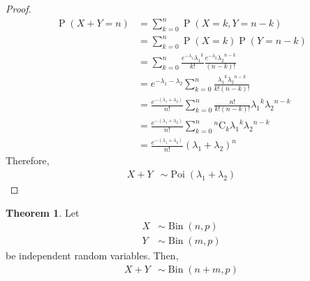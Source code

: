 \documentclass[titlepage, fleqn, a4paper, 12pt, twoside]{article}
\theoremstyle{definition}
\theoremstyle{theorem}
\newtheorem{theorem}{Theorem}
\DeclareMathOperator{\prob}{\mathrm{P}}
\DeclareMathOperator{\bin}{\mathrm{Bin}}
\DeclareMathOperator{\poi}{\mathrm{Poi}}
\newcommand*{\comb}[2]{{}^{#1}\mathrm{C}_{#2}}%
\begin{document}
\begin{proof}
	\begin{align*}
		\prob(X + Y = n) & = \sum\limits_{k = 0}^{n} \prob(X = k , Y = n - k)                                                                         \\
                                 & = \sum\limits_{k = 0}^{n} \prob(X = k) \prob(Y = n - k)                                                                    \\
                                 & = \sum\limits_{k = 0}^{n} \frac{e^{-\lambda_1} {\lambda_1}^k}{k!} \frac{e^{-\lambda_2} {\lambda_2}^{n - k}}{(n - k)!}      \\
                                 & = e^{-\lambda_1 - \lambda_2} \sum\limits_{k = 0}^{n} \frac{{\lambda_1}^k {\lambda_2}^{n - k}}{k! (n - k)!}                 \\
                                 & = \frac{e^{-(\lambda_1 + \lambda_2)}}{n!} \sum\limits_{k = 0}^{n} \frac{n!}{k! (n - k)!} {\lambda_1}^k {\lambda_2}^{n - k} \\
                                 & = \frac{e^{-(\lambda_1 + \lambda_2)}}{n!} \sum\limits_{k = 0}^{n} \comb{n}{k} {\lambda_1}^k {\lambda_2}^{n - k}            \\
                                 & = \frac{e^{-(\lambda_1 + \lambda_2)}}{n!} (\lambda_1 + \lambda_2)^n
	\end{align*}
	Therefore,
	\begin{align*}
		X + Y & \sim \poi(\lambda_1 + \lambda_2)
	\end{align*}
\end{proof}

\begin{theorem}
	Let
	\begin{align*}
		X & \sim \bin(n,p) \\
		Y & \sim \bin(m,p)
	\end{align*}
	be independent random variables.
	Then,
	\begin{align*}
		X + Y & \sim \bin(n + m , p)
	\end{align*}
\end{theorem}
\end{document}
